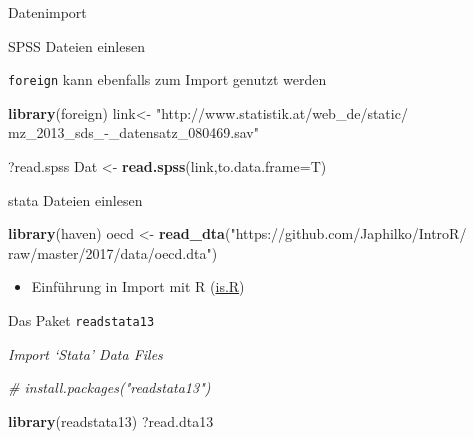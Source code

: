 \documentclass[ignorenonframetext,]{beamer}
\newenvironment{Shaded}{}{}
\newcommand{\KeywordTok}[1]{\textcolor[rgb]{0.00,0.44,0.13}{\textbf{{#1}}}}
\newcommand{\DataTypeTok}[1]{\textcolor[rgb]{0.56,0.13,0.00}{{#1}}}
\newcommand{\StringTok}[1]{\textcolor[rgb]{0.25,0.44,0.63}{{#1}}}
\newcommand{\CommentTok}[1]{\textcolor[rgb]{0.38,0.63,0.69}{\textit{{#1}}}}
\newcommand{\NormalTok}[1]{{#1}}
\providecommand{\tightlist}{%
\setlength{\itemsep}{0pt}\setlength{\parskip}{0pt}}
\begin{document}
\begin{frame}[fragile]{Datenimport}
\begin{block}{SPSS Dateien einlesen}
\end{block}

\begin{block}{\texttt{foreign} kann ebenfalls zum Import genutzt werden}

\begin{Shaded}
\begin{Highlighting}[]
\KeywordTok{library}\NormalTok{(foreign)}
\NormalTok{link<-}\StringTok{ "http://www.statistik.at/web_de/static/}
\StringTok{mz_2013_sds_-_datensatz_080469.sav"}

\NormalTok{?read.spss}
\NormalTok{Dat <-}\StringTok{ }\KeywordTok{read.spss}\NormalTok{(link,}\DataTypeTok{to.data.frame=}\NormalTok{T)}
\end{Highlighting}
\end{Shaded}

\end{block}

\begin{block}{stata Dateien einlesen}

\begin{Shaded}
\begin{Highlighting}[]
\KeywordTok{library}\NormalTok{(haven)}
\NormalTok{oecd <-}\StringTok{ }\KeywordTok{read_dta}\NormalTok{(}\StringTok{"https://github.com/Japhilko/IntroR/}
\StringTok{                 raw/master/2017/data/oecd.dta"}\NormalTok{)}
\end{Highlighting}
\end{Shaded}

\begin{itemize}
\tightlist
\item
  Einführung in Import mit R
  (\href{http://is-r.tumblr.com/post/37181850668/reading-writing-stata-dta-files-with-foreign}{is.R})
\end{itemize}

\end{block}

\begin{block}{Das Paket \texttt{readstata13}}

\begin{block}{\emph{Import `Stata' Data Files}}

\begin{Shaded}
\begin{Highlighting}[]
\CommentTok{# install.packages("readstata13")}
\end{Highlighting}
\end{Shaded}

\begin{Shaded}
\begin{Highlighting}[]
\KeywordTok{library}\NormalTok{(readstata13)}
\NormalTok{?read.dta13}
\end{Highlighting}
\end{Shaded}


\end{block}
\end{block}
\end{frame}
\end{document}
